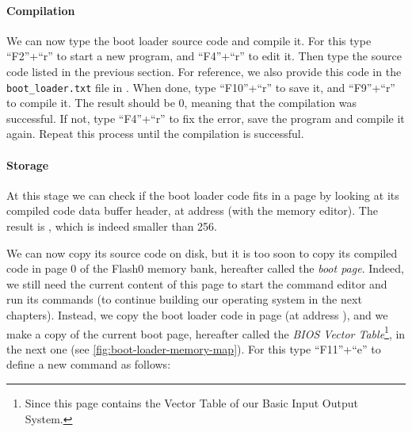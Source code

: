 \bigskip \paragraph{Compilation} We can now type the boot loader source code
and compile it. For this type ``F2''+``r'' to start a new program, and
``F4''+``r'' to edit it. Then type the source code listed in the previous
section. For reference, we also provide this code in the {\tt boot\_loader.txt}
file in . When done, type ``F10''+``r'' to save it, and
``F9''+``r'' to compile it. The result should be 0, meaning that the
compilation was successful. If not, type ``F4''+``r'' to fix the error, save
the program and compile it again. Repeat this process until the compilation is
successful.


\bigskip \paragraph{Storage} At this stage we can check if the boot loader code
fits in a page by looking at its compiled code data buffer header, at address
 (with the memory editor). The result is
, which is indeed smaller than 256.

We can now copy its source code on disk, but it is too soon to copy
its compiled code in page 0 of the Flash0 memory bank, hereafter called the
{\em boot page}. Indeed, we still need the current content of this page to
start the command editor and run its commands (to continue building our
operating system in the next chapters). Instead, we copy the boot loader code
in page  (at address
), and we make a copy of the current boot page,
hereafter called the {\em BIOS Vector Table}\footnote{Since this page contains
the Vector Table of our Basic Input Output System.}, in the next one (see
\cref{fig:boot-loader-memory-map}). For this type ``F11''+``e'' to define a new
command as follows:


